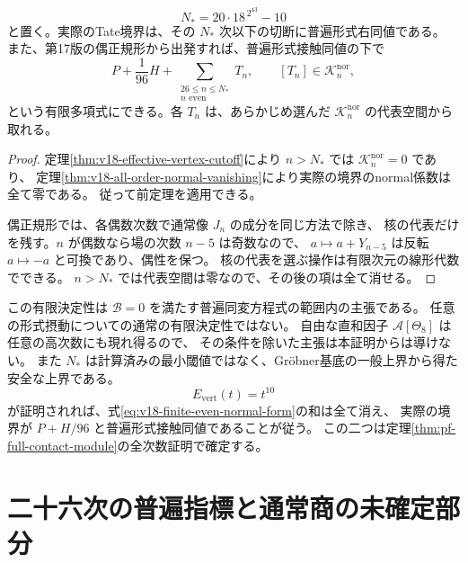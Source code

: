 \begin{corollary}[実際の境界に対する一つの普遍上界]
\label{cor:v18-explicit-finite-boundary}
\begin{equation}\label{eq:v18-explicit-finite-degree}
 N_* =20\cdot18^{\,2^{43}}-10
\end{equation}
と置く。実際のTate境界は、その $N_*$ 次以下の切断に普遍形式右同値である。
また、第17版の偶正規形から出発すれば、普遍形式接触同値の下で
\begin{equation}\label{eq:v18-finite-even-normal-form}
 P+\frac1{96}H+
 \sum_{\substack{26\le n\le N_*\\n\text{ even}}}T_n,
 \qquad [T_n]\in\mathcal K_n^{\mathrm{nor}},
\end{equation}
という有限多項式にできる。各 $T_n$ は、あらかじめ選んだ
$\mathcal K_n^{\mathrm{nor}}$ の代表空間から取れる。
\end{corollary}

\begin{proof}
定理\ref{thm:v18-effective-vertex-cutoff}により
$n>N_*$ では $\mathcal K_n^{\mathrm{nor}}=0$ であり、
定理\ref{thm:v18-all-order-normal-vanishing}により実際の境界のnormal係数は全て零である。
従って前定理を適用できる。

偶正規形では、各偶数次数で通常像 $J_n$ の成分を同じ方法で除き、
核の代表だけを残す。$n$ が偶数なら場の次数 $n-5$ は奇数なので、
$a\mapsto a+Y_{n-5}$ は反転 $a\mapsto-a$ と可換であり、偶性を保つ。
核の代表を選ぶ操作は有限次元の線形代数でできる。
$n>N_*$ では代表空間は零なので、その後の項は全て消せる。
\end{proof}

\begin{remark}[有限決定性の範囲と残る問題]
この有限決定性は $\mathcal B=0$ を満たす普遍同変方程式の範囲内の主張である。
任意の形式摂動についての通常の有限決定性ではない。
自由な直和因子 $\mathcal A[\Theta_8]$ は任意の高次数にも現れ得るので、
その条件を除いた主張は本証明からは導けない。
また $N_*$ は計算済みの最小閾値ではなく、Gr\"obner基底の一般上界から得た安全な上界である。
\[
 E_{\mathrm{vert}}(t)=t^{10}
\]
が証明されれば、式\eqref{eq:v18-finite-even-normal-form}の和は全て消え、
実際の境界が $P+H/96$ と普遍形式接触同値であることが従う。
この二つは定理\ref{thm:pf-full-contact-module}の全次数証明で確定する。
\end{remark}



\section{二十六次の普遍指標と通常商の未確定部分}
\label{sec:v18-characters}

